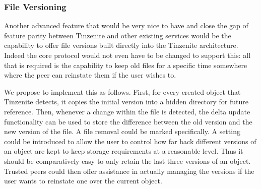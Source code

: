 \subsubsection{File Versioning}
\label{subs:File Versioning}

Another advanced feature that would be very nice to have and close the gap of feature parity between Tinzenite and other existing services would be the capability to offer file versions built directly into the Tinzenite architecture.
Indeed the core protocol would not even have to be changed to support this: all that is required is the capability to keep old files for a specific time somewhere where the peer can reinstate them if the user wishes to.

We propose to implement this as follows.
First, for every created object that Tinzenite detects, it copies the initial version into a hidden directory for future reference.
Then, whenever a change within the file is detected, the delta update functionality can be used to store the difference between the old version and the new version of the file.
A file removal could be marked specifically.
A setting could be introduced to allow the user to control how far back different versions of an object are kept to keep storage requirements at a reasonable level.
Thus it should be comparatively easy to only retain the last three versions of an object.
Trusted peers could then offer assistance in actually managing the versions if the user wants to reinstate one over the current object.
